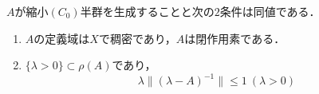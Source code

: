 \thm[吉田-Hilleの定理]
$A$が縮小$(C_0)$半群を生成することと次の$2$条件は同値である．
\begin{enumerate}
\renewcommand{\labelenumi}{(\theenumi)}
\item $A$の定義域は$X$で稠密であり，$A$は閉作用素である．
\item $\{\lambda > 0\} \subset \rho (A)$であり，
\[
\lambda \| (\lambda - A)^{-1} \| \le 1 \ (\lambda > 0)
\]
\end{enumerate}
\thmx


